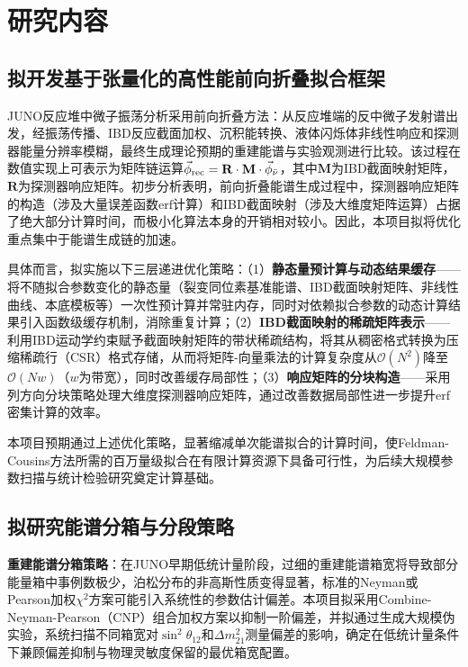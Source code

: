 \documentclass[a4paper, 12pt, UTF8]{ctexart}
\begin{document}
\section{研究内容}

\subsection{拟开发基于张量化的高性能前向折叠拟合框架}

JUNO反应堆中微子振荡分析采用前向折叠方法：从反应堆端的反中微子发射谱出发，经振荡传播、IBD反应截面加权、沉积能转换、液体闪烁体非线性响应和探测器能量分辨率模糊，最终生成理论预期的重建能谱与实验观测进行比较。该过程在数值实现上可表示为矩阵链运算$\vec{\phi}_{\rm rec} = \mathbf{R} \cdot \mathbf{M} \cdot \vec{\phi}_{\bar\nu}$，其中$\mathbf{M}$为IBD截面映射矩阵，$\mathbf{R}$为探测器响应矩阵。初步分析表明，前向折叠能谱生成过程中，探测器响应矩阵的构造（涉及大量误差函数$\mathrm{erf}$计算）和IBD截面映射（涉及大维度矩阵运算）占据了绝大部分计算时间，而极小化算法本身的开销相对较小。因此，本项目拟将优化重点集中于能谱生成链的加速。

具体而言，拟实施以下三层递进优化策略：（1）\textbf{静态量预计算与动态结果缓存}——将不随拟合参数变化的静态量（裂变同位素基准能谱、IBD截面映射矩阵、非线性曲线、本底模板等）一次性预计算并常驻内存，同时对依赖拟合参数的动态计算结果引入函数级缓存机制，消除重复计算；（2）\textbf{IBD截面映射的稀疏矩阵表示}——利用IBD运动学约束赋予截面映射矩阵的带状稀疏结构，将其从稠密格式转换为压缩稀疏行（CSR）格式存储，从而将矩阵-向量乘法的计算复杂度从$\mathcal{O}(N^2)$降至$\mathcal{O}(Nw)$（$w$为带宽），同时改善缓存局部性；（3）\textbf{响应矩阵的分块构造}——采用列方向分块策略处理大维度探测器响应矩阵，通过改善数据局部性进一步提升$\mathrm{erf}$密集计算的效率。

本项目预期通过上述优化策略，显著缩减单次能谱拟合的计算时间，使Feldman-Cousins方法所需的百万量级拟合在有限计算资源下具备可行性，为后续大规模参数扫描与统计检验研究奠定计算基础。

\subsection{拟研究能谱分箱与分段策略}

\textbf{重建能谱分箱策略}：在JUNO早期低统计量阶段，过细的重建能谱箱宽将导致部分能量箱中事例数极少，泊松分布的非高斯性质变得显著，标准的Neyman或Pearson加权$\chi^2$方案可能引入系统性的参数估计偏差。本项目拟采用Combine-Neyman-Pearson（CNP）组合加权方案以抑制一阶偏差，并拟通过生成大规模伪实验，系统扫描不同箱宽对$\sin^2\theta_{12}$和$\Delta m^2_{21}$测量偏差的影响，确定在低统计量条件下兼顾偏差抑制与物理灵敏度保留的最优箱宽配置。
\end{document}
